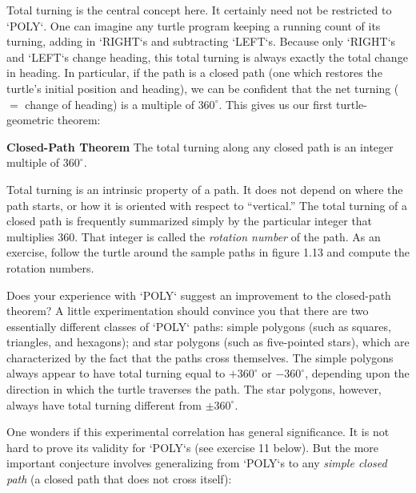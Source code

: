 \documentclass{book}
\begin{document}
Total turning is the central concept here. It certainly need not be
restricted to \textsc{`POLY`}. One can imagine any turtle program keeping a
running count of its turning, adding in \textsc{`RIGHT`}s and subtracting \textsc{`LEFT`}s.
Because only \textsc{`RIGHT`}s and \textsc{`LEFT`}s change heading, this total turning is
always exactly the total change in heading. In particular, if the path is a
closed path (one which restores the turtle's initial position and heading),
we can be confident that the net turning ($=$ change of heading) is a
multiple of $360^{\circ}$. This gives us our first turtle-geometric theorem:

\vspace{0.5cm}

\noindent \textbf{Closed-Path Theorem} The total turning along any closed path is an
integer multiple of $360^{\circ}$.

\vspace{0.5cm}

Total turning is an intrinsic property of a path. It does not depend on
where the path starts, or how it is oriented with respect to ``vertical.''
The total turning of a closed path is frequently summarized simply by
the particular integer that multiplies 360. That integer is called the
{\em rotation number} of the path. As an exercise, follow the turtle around
the sample paths in figure 1.13 and compute the rotation numbers.

Does your experience with \textsc{`POLY`} suggest an improvement to the closed-path 
theorem? A little experimentation should convince you that there
are two essentially different classes of \textsc{`POLY`} paths: simple polygons (such
as squares, triangles, and hexagons); and star polygons (such as five-pointed stars), which are characterized by the fact that the paths cross
themselves. The simple polygons always appear to have total turning
equal to $+360^{\circ}$ or $-360^{\circ}$, depending upon the direction in which the
turtle traverses the path. The star polygons, however, always have total
turning different from $\pm 360^{\circ}$.

One wonders if this experimental correlation has general significance.
It is not hard to prove its validity for \textsc{`POLY`}s (see exercise 11 below). But
the more important conjecture involves generalizing from \textsc{`POLY`}s to any
{\em simple closed path} (a closed path that does not cross itself):

\vspace{0.5cm}
\end{document}
